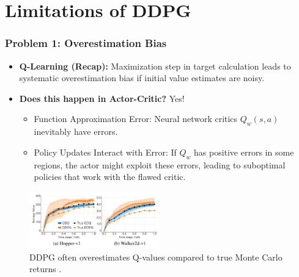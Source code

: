 \documentclass[9pt, aspectratio=169]{beamer}
\begin{document}

\section{Limitations of DDPG}

\begin{frame}
  \frametitle{Problem 1: Overestimation Bias}
    \begin{itemize}
        \item \textbf{Q-Learning (Recap):} Maximization step in target calculation leads to systematic overestimation bias if initial value estimates are noisy.
        \item \textbf{Does this happen in Actor-Critic?} Yes!
        \begin{itemize}
            \item Function Approximation Error: Neural network critics $Q_w(s,a)$ inevitably have errors.
            \item Policy Updates Interact with Error: If $Q_w$ has positive errors in some regions, the actor might exploit these errors, leading to suboptimal policies that work with the flawed critic.
        \end{itemize}
    \end{itemize}

    \begin{figure}
        \centering
        \includegraphics[width=0.5\textwidth]{ddpg-overestimation.png}
        \caption{DDPG often overestimates Q-values compared to true Monte Carlo returns \cite{fujimoto2018addressingfunctionapproximationerror}.}
    \end{figure}
\end{frame}
\end{document}
